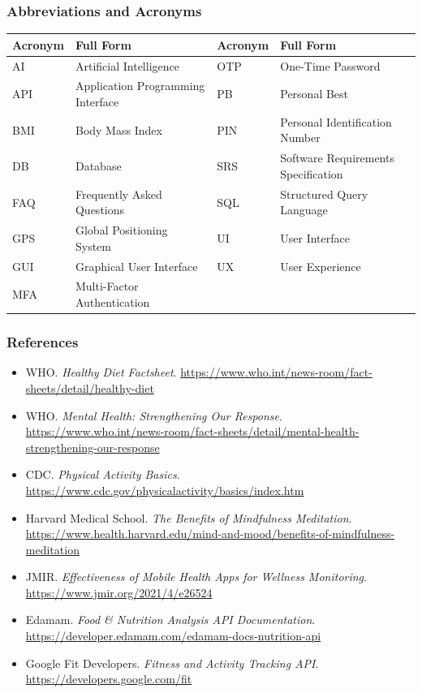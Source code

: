 \documentclass[11pt,a4paper]{report}
\begin{document}
\subsubsection*{Abbreviations and Acronyms}
\begin{center}\small
\begin{tabular}{@{}ll@{\hspace{0.6cm}}ll@{}}\toprule
\textbf{Acronym} & \textbf{Full Form} & \textbf{Acronym} & \textbf{Full Form}\\\midrule
AI & Artificial Intelligence & OTP & One-Time Password\\
API & Application Programming Interface & PB & Personal Best\\
BMI & Body Mass Index & PIN & Personal Identification Number\\
DB & Database & SRS & Software Requirements Specification\\
FAQ & Frequently Asked Questions & SQL & Structured Query Language\\
GPS & Global Positioning System & UI & User Interface\\
GUI & Graphical User Interface & UX & User Experience\\
MFA & Multi-Factor Authentication & & \\\bottomrule
\end{tabular}\end{center}

\subsubsection*{References}
\begin{itemize}
 \item WHO. \emph{Healthy Diet Factsheet}. \url{https://www.who.int/news-room/fact-sheets/detail/healthy-diet}
 \item WHO. \emph{Mental Health: Strengthening Our Response}. \url{https://www.who.int/news-room/fact-sheets/detail/mental-health-strengthening-our-response}
 \item CDC. \emph{Physical Activity Basics}. \url{https://www.cdc.gov/physicalactivity/basics/index.htm}
 \item Harvard Medical School. \emph{The Benefits of Mindfulness Meditation}. \url{https://www.health.harvard.edu/mind-and-mood/benefits-of-mindfulness-meditation}
 \item JMIR. \emph{Effectiveness of Mobile Health Apps for Wellness Monitoring}. \url{https://www.jmir.org/2021/4/e26524}
 \item Edamam. \emph{Food \& Nutrition Analysis API Documentation}. \url{https://developer.edamam.com/edamam-docs-nutrition-api}
 \item Google Fit Developers. \emph{Fitness and Activity Tracking API}. \url{https://developers.google.com/fit}
\end{itemize}
\end{document}
